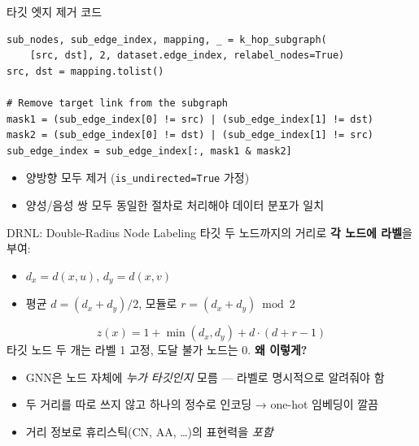 \begin{frame}[fragile]{타깃 엣지 제거 코드}
\begin{lstlisting}
sub_nodes, sub_edge_index, mapping, _ = k_hop_subgraph(
    [src, dst], 2, dataset.edge_index, relabel_nodes=True)
src, dst = mapping.tolist()

# Remove target link from the subgraph
mask1 = (sub_edge_index[0] != src) | (sub_edge_index[1] != dst)
mask2 = (sub_edge_index[0] != dst) | (sub_edge_index[1] != src)
sub_edge_index = sub_edge_index[:, mask1 & mask2]
\end{lstlisting}
\begin{itemize}
  \item 양방향 모두 제거 (\texttt{is\_undirected=True} 가정)
  \item 양성/음성 쌍 모두 동일한 절차로 처리해야 데이터 분포가 일치
\end{itemize}
\end{frame}

\begin{frame}{DRNL: Double-Radius Node Labeling}
타깃 두 노드까지의 거리로 \textbf{각 노드에 라벨}을 부여:
\begin{itemize}
  \item $d_x = d(x,u)$, $d_y = d(x,v)$
  \item 평균 $d=(d_x+d_y)/2$, 모듈로 $r = (d_x+d_y) \bmod 2$
\end{itemize}
\begin{equation*}
  z(x) = 1 + \min(d_x,d_y) + d\cdot(d+r-1)
\end{equation*}
타깃 노드 두 개는 라벨 1 고정, 도달 불가 노드는 0.
\vspace{0.4em}
\textbf{왜 이렇게?}
\begin{itemize}
  \item GNN은 노드 자체에 \emph{누가 타깃인지} 모름 — 라벨로 명시적으로 알려줘야 함
  \item 두 거리를 따로 쓰지 않고 하나의 정수로 인코딩 → one-hot 임베딩이 깔끔
  \item 거리 정보로 휴리스틱(CN, AA, \ldots)의 표현력을 \emph{포함}
\end{itemize}
\end{frame}

